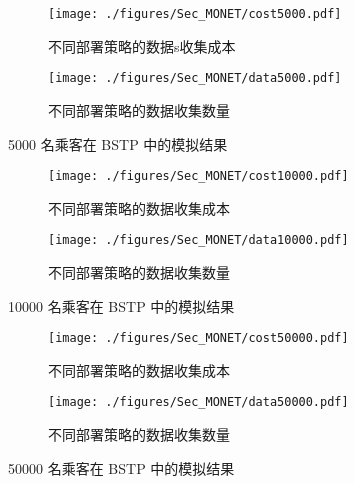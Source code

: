 \begin{figure}[!h]
  \centering
  \begin{subfigure}[b]{0.45\linewidth}
    \texttt{[image: ./figures/Sec\_MONET/cost5000.pdf]}
    \label{fig_cost5000}
    \vspace{-2em}
    \caption{不同部署策略的数据s收集成本}
  \end{subfigure}
  \begin{subfigure}[b]{0.45\linewidth}
    \texttt{[image: ./figures/Sec\_MONET/data5000.pdf]}
    \label{fig_data5000}
    \vspace{-2em}
    \caption{不同部署策略的数据收集数量}
  \end{subfigure}
    \vspace{-0.5em}
    \caption{5000 名乘客在 BSTP 中的模拟结果}
  \label{fig_5000}
\end{figure}

\begin{figure}[!h]
  \centering
  \begin{subfigure}[b]{0.45\linewidth}
    \texttt{[image: ./figures/Sec\_MONET/cost10000.pdf]}
    \label{fig_cost10000}
    \vspace{-2em}
    \caption{不同部署策略的数据收集成本}
  \end{subfigure}
  \begin{subfigure}[b]{0.45\linewidth}
    \texttt{[image: ./figures/Sec\_MONET/data10000.pdf]}
    \label{fig_data10000}
    \vspace{-2em}
    \caption{不同部署策略的数据收集数量}
  \end{subfigure}
    \vspace{-0.5em}
    \caption{10000 名乘客在 BSTP 中的模拟结果}
  \label{fig_10000}
\end{figure}

\begin{figure}[!h]
  \centering
  \begin{subfigure}[b]{0.45\linewidth}
    \texttt{[image: ./figures/Sec\_MONET/cost50000.pdf]}
    \label{fig_cost50000}
    \vspace{-2em}
    \caption{不同部署策略的数据收集成本}
  \end{subfigure}
  \begin{subfigure}[b]{0.45\linewidth}
    \texttt{[image: ./figures/Sec\_MONET/data50000.pdf]}
    \label{fig_data50000}
    \vspace{-2em}
    \caption{不同部署策略的数据收集数量}
  \end{subfigure}
    \vspace{-0.5em}
    \caption{50000 名乘客在 BSTP 中的模拟结果}
  \label{fig_50000}
\end{figure}

